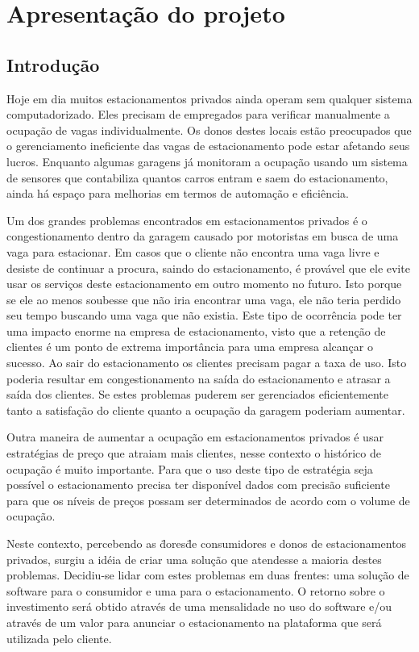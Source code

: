 \part{Apresentação do projeto}

\chapter[Introdução]{Introdução}

Hoje em dia muitos estacionamentos privados ainda operam sem qualquer sistema computadorizado. Eles precisam de empregados para verificar manualmente a ocupação de vagas individualmente. Os donos destes locais estão preocupados que o gerenciamento ineficiente das vagas de estacionamento pode estar afetando seus lucros. Enquanto algumas garagens já monitoram a ocupação usando um sistema de sensores que contabiliza quantos carros entram e saem do estacionamento, ainda há espaço para melhorias em termos de automação e eficiência.

Um dos grandes problemas encontrados em estacionamentos privados é o congestionamento dentro da garagem causado por motoristas em busca de uma vaga para estacionar. Em casos que o cliente não encontra uma vaga livre e desiste de continuar a procura, saindo do estacionamento, é provável que ele evite usar os serviços deste estacionamento em outro momento no futuro. Isto porque se ele ao menos soubesse que não iria encontrar uma vaga, ele não teria perdido seu tempo buscando uma vaga que não existia. Este tipo de ocorrência pode ter uma impacto enorme na empresa de estacionamento, visto que a retenção de clientes é um ponto de extrema importância para uma empresa alcançar o sucesso. Ao sair do estacionamento os clientes precisam pagar a taxa de uso. Isto poderia resultar em congestionamento na saída do estacionamento e atrasar a saída dos clientes. Se estes problemas puderem ser gerenciados eficientemente tanto a satisfação do cliente quanto a ocupação da garagem poderiam aumentar.

Outra maneira de aumentar a ocupação em estacionamentos privados é usar estratégias de preço que atraiam mais clientes, nesse contexto o histórico de ocupação é muito importante. Para que o uso deste tipo de estratégia seja possível o estacionamento precisa ter disponível dados com precisão suficiente para que os níveis de preços possam ser determinados de acordo com o volume de ocupação.

Neste contexto, percebendo as \"dores\" de consumidores e donos de estacionamentos privados, surgiu a idéia de criar uma solução que atendesse a maioria destes problemas. Decidiu-se lidar com estes problemas em duas frentes: uma solução de software para o consumidor e uma para o estacionamento. O retorno sobre o investimento será obtido através de uma mensalidade no uso do software e/ou através de um valor para anunciar o estacionamento na plataforma que será utilizada pelo cliente.

